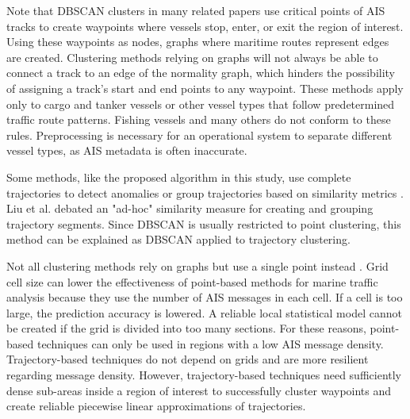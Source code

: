 \documentclass[preprint,12pt]{elsarticle}
\begin{document}
Note that DBSCAN clusters in many related papers use critical points of AIS tracks to create waypoints where vessels stop, enter, or exit the region of interest. Using these waypoints as nodes, graphs where maritime routes represent edges are created. Clustering methods relying on graphs will not always be able to connect a track to an edge of the normality graph, which hinders the possibility of assigning a track's start and end points to any waypoint. These methods apply only to cargo and tanker vessels or other vessel types that follow predetermined traffic route patterns. Fishing vessels and many others do not conform to these rules. Preprocessing is necessary for an operational system to separate different vessel types, as AIS metadata is often inaccurate.

Some methods, like the proposed algorithm in this study, use complete trajectories to detect anomalies or group trajectories based on similarity metrics \citep{2011Laxhammar, Vries2013}. Liu et al. \citep{2015Liu} debated an "ad-hoc" similarity measure for creating and grouping trajectory segments. Since DBSCAN is usually restricted to point clustering, this method can be explained as DBSCAN applied to trajectory clustering. 

Not all clustering methods rely on graphs but use a single point instead \citep{2012Kowalska, 2013Guillarme}. Grid cell size can lower the effectiveness of point-based methods for marine traffic analysis because they use the number of AIS messages in each cell. If a cell is too large, the prediction accuracy is lowered. A reliable local statistical model cannot be created if the grid is divided into too many sections. For these reasons, point-based techniques can only be used in regions with a low AIS message density. Trajectory-based techniques do not depend on grids and are more resilient regarding message density. However, trajectory-based techniques need sufficiently dense sub-areas inside a region of interest to successfully cluster waypoints and create reliable piecewise linear approximations of trajectories.
\end{document}
